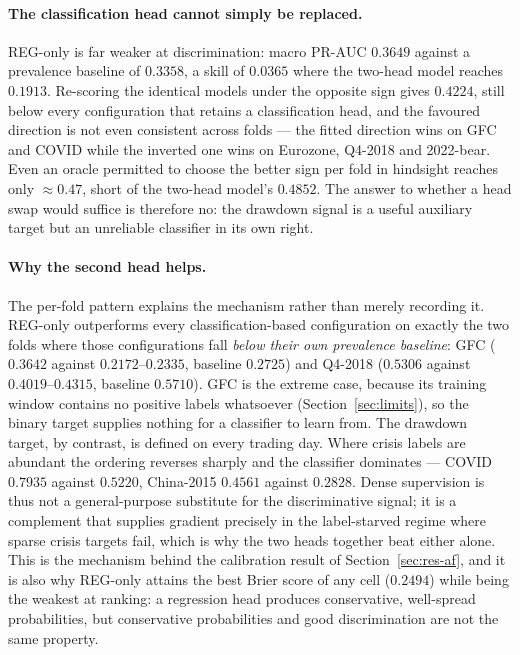 \documentclass[11pt,a4paper]{article}
\newcommand{\prauc}{\mbox{PR-AUC}}
\begin{document}
\paragraph{The classification head cannot simply be replaced.} REG-only is far
weaker at discrimination: macro $\prauc$ $0.3649$ against a prevalence
baseline of $0.3358$, a skill of $0.0365$ where the two-head model reaches
$0.1913$. Re-scoring the identical models under the opposite sign gives
$0.4224$, still below every configuration that retains a classification head,
and the favoured direction is not even consistent across folds --- the fitted
direction wins on GFC and COVID while the inverted one wins on Eurozone,
Q4-2018 and 2022-bear. Even an oracle permitted to choose the better sign per
fold in hindsight reaches only $\approx0.47$, short of the two-head model's
$0.4852$. The answer to whether a head swap would suffice is therefore no: the
drawdown signal is a useful auxiliary target but an unreliable classifier in
its own right.

\paragraph{Why the second head helps.} The per-fold pattern explains the
mechanism rather than merely recording it. REG-only outperforms every
classification-based configuration on exactly the two folds where those
configurations fall \emph{below their own prevalence baseline}: GFC
($0.3642$ against $0.2172$--$0.2335$, baseline $0.2725$) and Q4-2018
($0.5306$ against $0.4019$--$0.4315$, baseline $0.5710$). GFC is the extreme
case, because its training window contains no positive labels whatsoever
(Section~\ref{sec:limits}), so the binary target supplies nothing for a
classifier to learn from. The drawdown target, by contrast, is defined on
every trading day. Where crisis labels are abundant the ordering reverses
sharply and the classifier dominates --- COVID $0.7935$ against $0.5220$,
China-2015 $0.4561$ against $0.2828$. Dense supervision is thus not a
general-purpose substitute for the discriminative signal; it is a complement
that supplies gradient precisely in the label-starved regime where sparse
crisis targets fail, which is why the two heads together beat either alone.
This is the mechanism behind the calibration result of
Section~\ref{sec:res-af}, and it is also why REG-only attains the best Brier
score of any cell ($0.2494$) while being the weakest at ranking: a regression
head produces conservative, well-spread probabilities, but conservative
probabilities and good discrimination are not the same property.
\end{document}
